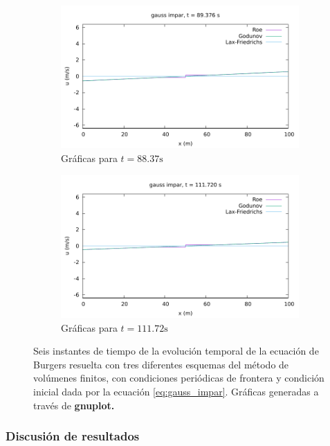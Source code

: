 \documentclass[12pt]{article}
\begin{document}
\begin{figure}[h!]
\begin{subfigure}{0.49\textwidth}
			\includegraphics[width=\textwidth]{../burgers1DVF/results/sol_periodicas/gauss_impar/084.pdf}
			\caption*{Gráficas para $t=88.37\unit{\second}$}
			\label{fig:gauss_impar-perio5}
		\end{subfigure}\hfill
		\begin{subfigure}{0.49\textwidth}
			\centering
			\includegraphics[width=\textwidth]{../burgers1DVF/results/sol_periodicas/gauss_impar/105.pdf}
			\caption*{Gráficas para $t=111.72\unit{\second}$}
			\label{fig:gauss_impar-perio6}
		\end{subfigure}
		\caption{Seis instantes de tiempo de la evolución temporal de  la ecuación de Burgers resuelta con tres diferentes esquemas del método de volúmenes finitos, con condiciones periódicas de frontera y condición inicial dada por la ecuación \ref{eq:gauss_impar}. Gráficas generadas a través de \textbf{gnuplot.}}
		\label{fig:gauss_impar-periodica}
	\end{figure}
	\clearpage	
	\subsubsection{Discusión de resultados}
\end{document}
